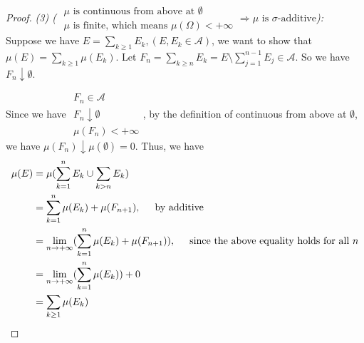 \begin{proof}
  \emph{(3) (
    $\substack{
      \mbox{$\mu$ is continuous from above at $\emptyset$} \\
      \mbox{$\mu$ is finite, which means $\mu(\Omega)<+\infty$}
    } \Rightarrow \mbox{$\mu$ is $\sigma$-additive}
  $):} \\
  Suppose we have $E = \sum_{k\geq 1} E_k, (E, E_k\in\mathcal{A})$, we want to show that $\mu(E) = \sum_{k\geq 1} \mu(E_k)$.
  Let $F_n = \sum_{k\geq n} E_k = E\setminus \sum_{j=1}^{n-1}E_j \in \mathcal{A}$.
  So we have $F_n\downarrow \emptyset$.

  Since we have $\substack{F_n\in\mathcal{A} \\ F_n\downarrow\emptyset\\ \mu(F_n)<+\infty}$, by the definition of continuous from above at $\emptyset$,
  we have $\mu(F_n)\downarrow \mu(\emptyset) = 0$.
  Thus, we have
  \begin{align*}
    \mu(E) &= \mu(\sum_{k=1}^{n} E_k \cup \sum_{k > n} E_k) \\
    &= \sum_{k=1}^n \mu(E_k) + \mu(F_{n+1}), \hspace{0.5cm} \mbox{by additive} \\
    &= \lim_{n\to+\infty} (\sum_{k=1}^n \mu(E_k) + \mu(F_{n+1})), \hspace{0.5cm} \mbox{since the above equality holds for all $n$} \\
    &= \lim_{n\to+\infty} (\sum_{k=1}^n \mu(E_k)) + 0 \\
    &= \sum_{k\geq 1} \mu(E_k)
  \end{align*}
\end{proof}

